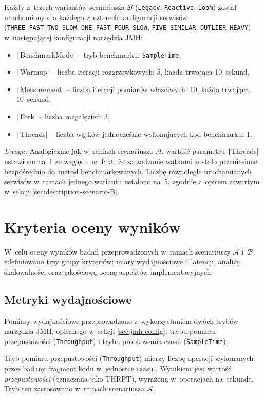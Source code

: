 Każdy z~trzech wariantów scenariusza $\mathcal{B}$ (\texttt{Legacy}, \texttt{Reactive}, \texttt{Loom}) został uruchomiony dla każdego z~czterech konfiguracji serwisów (\texttt{THREE\_FAST\_TWO\_SLOW}, \texttt{ONE\_FAST\_FOUR\_SLOW}, \texttt{FIVE\_SIMILAR}, \texttt{OUTLIER\_HEAVY}) w~następującej konfiguracji narzędzia JMH:
\begin{itemize}
    \item \texttt|BenchmarkMode| -- tryb benchmarku: \texttt{SampleTime},
    \item \texttt|Warmup| -- liczba iteracji rozgrzewkowych: 5, każda trwająca 10~sekund,
    \item \texttt|Measurement| -- liczba iteracji pomiarów właściwych: 10, każda trwająca 10~sekund,
    \item \texttt|Fork| -- liczba rozgałęzień: 3,
    \item \texttt|Threads| -- liczba wątków jednocześnie wykonujących kod benchmarku: 1.
\end{itemize}
\textit{Uwaga:} Analogicznie jak w~ramach scenariusza $\mathcal{A}$, wartość parametru \texttt|Threads| ustawiono na~1 ze względu na fakt, że zarządzanie wątkami zostało przeniesione bezpośrednio do~metod benchmarkowanych. Liczbę równolegle uruchamianych serwisów w~ramach jednego wariantu ustalono na~5, zgodnie z~opisem zawartym w~sekcji \ref{sec:description-scenario-B}.

\section{Kryteria oceny wyników}

W~celu oceny wyników badań przeprowadzonych w~ramach scenariuszy $\mathcal{A}$ i~$\mathcal{B}$ zdefiniowano trzy grupy kryteriów: miary wydajnościowe i~latencji, analizę skalowalności oraz jakościową ocenę aspektów implementacyjnych.

\subsection{Metryki wydajnościowe}
\label{sec:metrics}

Pomiary wydajnościowe przeprowadzono z~wykorzystaniem dwóch trybów narzędzia JMH, opisanego w~sekcji \ref{sec:jmh-config}: trybu pomiaru przepustowości (\texttt{Throughput}) i trybu próbkowania czasu (\texttt{SampleTime}).

Tryb pomiaru przepustowości (\texttt{Throughput}) mierzy liczbę operacji wykonanych przez badany fragment kodu w~jednostce czasu \cite{jmh-documentation}. Wynikiem jest wartość \emph{przepustowości} (oznaczana jako THRPT), wyrażona w~operacjach na~sekundę. Tryb ten zastosowano w~ramach scenariusza $\mathcal{A}$.

